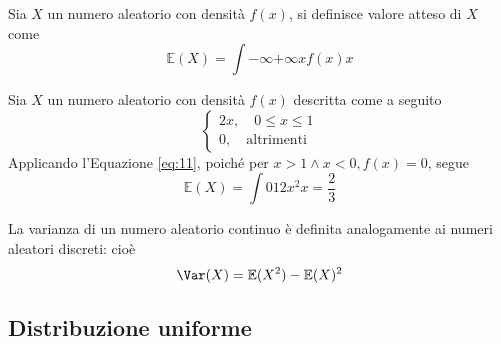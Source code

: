 \documentclass{subfiles}
\begin{document}
\begin{Definition*}
    Sia \(X\) un numero aleatorio con densità \(f(x)\), si definisce valore atteso di \(X\) come
    \begin{equation}
        \mathbb{E}(X) = \int{-\infty}{+\infty}{x f(x)}{x}
    \end{equation}
\end{Definition*}
\begin{Example*}
    Sia \(X\) un numero aleatorio con densità \(f(x)\) descritta come a seguito
    \[\begin{cases}
            2x,  \quad 0 \le x \le 1 \\
            0, \quad \text{altrimenti}
        \end{cases}\]
    Applicando l'Equazione \eqref{eq:11},  poiché per \(x > 1 \land x < 0, f(x) = 0\), segue
    \[
        \mathbb{E}(X) = \int{0}{1}{2x^{2}}{x} = \frac{2}{3}
    \]

    \noindent
    La varianza di un numero aleatorio continuo è definita analogamente ai numeri aleatori discreti: cioè
    \[
        \Var(X) = \mathbb{E}(X^{2}) - \mathbb{E}(X)^{2}
    \]
\end{Example*}

\subsection{Distribuzione uniforme}

\end{document}
